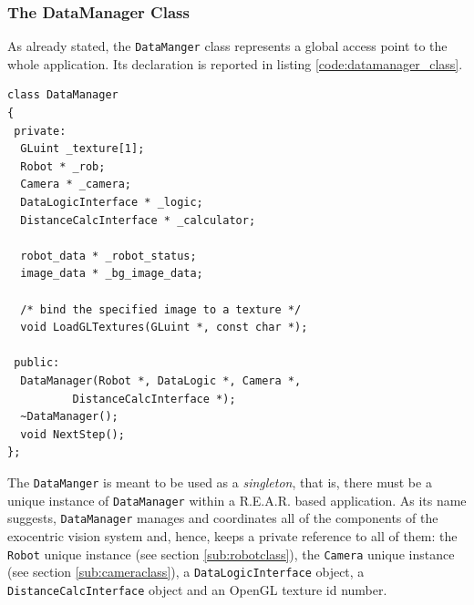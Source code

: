 \subsubsection{The DataManager Class}
\label{sub:datamanager}
As already stated, the \texttt{DataManger} class represents a global 
access point to the whole application. Its declaration is reported in
listing \ref{code:datamanager_class}.
%
\begin{lstlisting}[caption={DataManager class declaration}, label={code:datamanager_class}, frame=trBL]
class DataManager
{
 private:
  GLuint _texture[1];
  Robot * _rob;
  Camera * _camera;
  DataLogicInterface * _logic;
  DistanceCalcInterface * _calculator;

  robot_data * _robot_status;
  image_data * _bg_image_data;

  /* bind the specified image to a texture */
  void LoadGLTextures(GLuint *, const char *);

 public:
  DataManager(Robot *, DataLogic *, Camera *, 
	      DistanceCalcInterface *); 
  ~DataManager();
  void NextStep();
};
\end{lstlisting}
%
The \texttt{DataManger} is meant to be used as a \textit{singleton}, 
that is, there must be a unique instance of \texttt{DataManager} 
within a \textsf{R.E.A.R.} based application.
%
As its name suggests, \texttt{DataManager} manages and coordinates 
all of the components of the exocentric vision system and, hence, 
keeps a private reference to all of them: 
the \texttt{Robot} unique instance (see section \ref{sub:robotclass}), the 
\texttt{Camera} unique instance (see section \ref{sub:cameraclass}),
a \texttt{DataLogicInterface} object, a \texttt{DistanceCalcInterface} 
object and an OpenGL texture id number.
%


